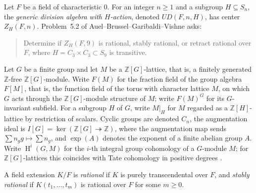 \documentclass[12pt,a4paper]{article}
\theoremstyle{definition}
\DeclareMathOperator{\Br}{Br}
\DeclareMathOperator{\coh}{H}
\begin{document}
Let \(F\) be a field of characteristic \(0\).
For an integer \(n \ge 1\) and a subgroup \(H \subseteq S_n\), the
\emph{generic division algebra with \(H\)-action}, denoted \(UD(F,n,H)\),
has center \(Z_H(F,n)\). Problem~5.2 of
Auel--Brussel--Garibaldi--Vishne \cite[Problem~5.2]{ABGV2011} asks:

\begin{quote}
Determine if \(Z_H(F,9)\) is rational, stably rational, or retract rational
over \(F\), where \(H = C_3 \times C_3 \subset S_9\) is transitive.
\end{quote}

Let \(G\) be a finite group and let \(M\) be a \(\mathbb{Z}[G]\)-lattice,
that is, a finitely generated \(\mathbb{Z}\)-free \(\mathbb{Z}[G]\)-module.
Write \(F(M)\) for the fraction field of the group algebra \(F[M]\),
that is, the function field of the torus with character lattice \(M\),
on which \(G\) acts through the \(\mathbb{Z}[G]\)-module structure of
\(M\); write \(F(M)^G\) for its \(G\)-invariant subfield.
For a subgroup \(H\) of \(G\), write \(M|_H\) for \(M\) regarded as a
\(\mathbb{Z}[H]\)-lattice by restriction of scalars.  Cyclic groups are
denoted \(C_n\), the augmentation ideal is
\(I[G] = \ker(\mathbb{Z}[G] \twoheadrightarrow \mathbb{Z})\), where the
augmentation map sends \(\sum n_g g \mapsto \sum n_g\), and \(\exp(A)\)
denotes the exponent of a finite abelian group \(A\).  Write
\(\coh^i(G, M)\) for the \(i\)-th integral group cohomology of a
\(G\)-module \(M\); for \(\mathbb{Z}[G]\)-lattices this coincides with
Tate cohomology in positive degrees \cite[Def.\ 6.2.4]{Weibel1994}.

A field extension \(K/F\) is \emph{rational} if \(K\) is purely
transcendental over \(F\), and \emph{stably rational} if
\(K(t_1, \dots, t_m)\) is rational over \(F\) for some \(m \ge 0\).

\end{document}
